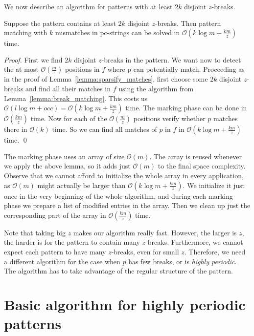 \documentclass[runningheads]{llncs}
\begin{document}
We now describe an algorithm for patterns with at least $2k$ disjoint $z$-breaks.

\begin{theorem}\label{theorem:algorithm_nonperiodic}
Suppose the pattern contains at least $2k$ disjoint $z$-breaks. Then pattern matching with $k$ mismatches in pc-strings can be solved in $\mathcal{O}(k\log m+ \frac{km}{z})$ time.
\end{theorem}

\begin{proof}
First we find $2k$ disjoint $z$-breaks in the pattern. We want now to detect the at most $\mathcal{O}(\frac{m}{z})$ positions in $f$ where p can potentially match. Proceeding as in the proof of Lemma~\ref{lemma:sparsify_matches}, first choose some $2k$ disjoint $z$-breaks and find all their matches in $f$ using the algorithm from Lemma~\ref{lemma:break_matching}. This costs us $\mathcal{O}(l\log m +occ)=\mathcal{O}(k\log m +\frac{km}{z})$ time. The marking phase can be done in $\mathcal{O}(\frac{km}{z})$ time. Now for each of the $\mathcal{O}(\frac{m}{z})$ positions verify whether $p$ matches there in $\mathcal{O}(k)$ time. So we can find all matches of $p$ in $f$ in $\mathcal{O}(k\log m +\frac{km}{z})$ time.
\qed
\end{proof}

\begin{remark}
The marking phase uses an array of size $\mathcal{O}(m)$. The array is reused whenever we apply the above lemma, so it adds just $\mathcal{O}(m)$ to the final space complexity.
Observe that we cannot afford to initialize the whole array in every application, as $\mathcal{O}(m)$ might actually be larger than $\mathcal{O}(k\log m+\frac{km}{z})$.
We initialize it just once in the very beginning of the whole algorithm, and during each marking phase we prepare a list of modified entries in the array. Then we clean up
just the corresponding part of the array in $\mathcal{O}(\frac{km}{z})$ time.
\end{remark}

Note that taking big $z$ makes our algorithm really fast. However, the larger is $z$, the harder is for the pattern to contain many $z$-breaks. Furthermore, we cannot expect each pattern to have many $z$-breaks, even for small $z$. Therefore, we need a different algorithm for the case when $p$ has few breaks, or is {\it highly periodic}. The algorithm has to take advantage of the regular structure of the pattern.

\section{Basic algorithm for highly periodic patterns}
\end{document}
